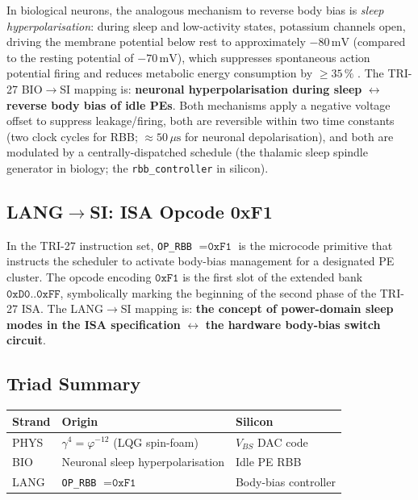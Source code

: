 In biological neurons, the analogous mechanism to reverse body bias is
\emph{sleep hyperpolarisation}: during sleep and low-activity states,
potassium channels open, driving the membrane potential below rest to
approximately $-80\,\text{mV}$ (compared to the resting potential of
$-70\,\text{mV}$), which suppresses spontaneous action potential firing and
reduces metabolic energy consumption by $\geq 35\,\%$ \citep{mukhopadhyay_2009}.
The TRI-27 BIO$\to$SI mapping is:
\textbf{neuronal hyperpolarisation during sleep}
$\leftrightarrow$ \textbf{reverse body bias of idle PEs}.
Both mechanisms apply a negative voltage offset to suppress leakage/firing,
both are reversible within two time constants (two clock cycles for RBB;
$\approx 50\,\mu\text{s}$ for neuronal depolarisation), and both are
modulated by a centrally-dispatched schedule (the thalamic sleep spindle
generator in biology; the \texttt{rbb\_controller} in silicon).

\subsection{LANG$\to$SI: ISA Opcode 0xF1}

In the TRI-27 instruction set, \texttt{OP\_RBB} $= \texttt{0xF1}$ is the
microcode primitive that instructs the scheduler to activate body-bias
management for a designated PE cluster.
The opcode encoding $\texttt{0xF1}$ is the first slot of the extended bank
$\texttt{0xD0..0xFF}$, symbolically marking the beginning of the second
phase of the TRI-27 ISA.
The LANG$\to$SI mapping is:
\textbf{the concept of power-domain sleep modes in the ISA specification}
$\leftrightarrow$ \textbf{the hardware body-bias switch circuit}.

\subsection{Triad Summary}

\begin{center}
\begin{tabular}{lll}
\hline
\textbf{Strand} & \textbf{Origin} & \textbf{Silicon} \\
\hline
PHYS & $\gamma^{4} = \varphi^{-12}$ (LQG spin-foam) & $V_{BS}$ DAC code \\
BIO  & Neuronal sleep hyperpolarisation & Idle PE RBB \\
LANG & \texttt{OP\_RBB} $= \texttt{0xF1}$ & Body-bias controller \\
\hline
\end{tabular}
\end{center}

